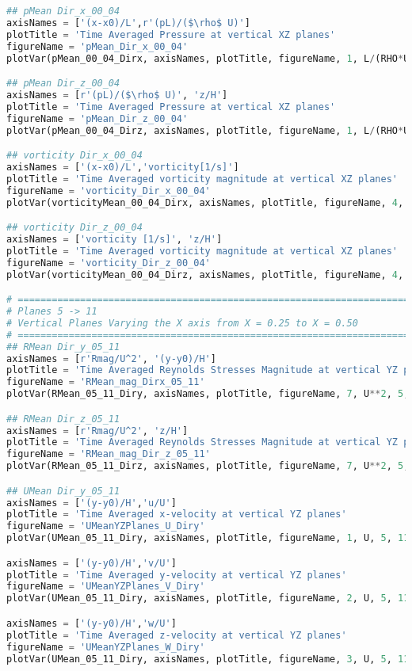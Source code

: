 \begin{lstlisting}[language=python]
## pMean Dir_x_00_04
axisNames = ['(x-x0)/L',r'(pL)/($\rho$ U)']
plotTitle = 'Time Averaged Pressure at vertical XZ planes'
figureName = 'pMean_Dir_x_00_04'
plotVar(pMean_00_04_Dirx, axisNames, plotTitle, figureName, 1, L/(RHO*U), 0, 4)

## pMean Dir_z_00_04
axisNames = [r'(pL)/($\rho$ U)', 'z/H']
plotTitle = 'Time Averaged Pressure at vertical XZ planes'
figureName = 'pMean_Dir_z_00_04'
plotVar(pMean_00_04_Dirz, axisNames, plotTitle, figureName, 1, L/(RHO*U), 0, 4)

## vorticity Dir_x_00_04
axisNames = ['(x-x0)/L','vorticity[1/s]']
plotTitle = 'Time Averaged vorticity magnitude at vertical XZ planes'
figureName = 'vorticity_Dir_x_00_04'
plotVar(vorticityMean_00_04_Dirx, axisNames, plotTitle, figureName, 4, 1, 0, 4)

## vorticity Dir_z_00_04
axisNames = ['vorticity [1/s]', 'z/H']
plotTitle = 'Time Averaged vorticity magnitude at vertical XZ planes'
figureName = 'vorticity_Dir_z_00_04'
plotVar(vorticityMean_00_04_Dirz, axisNames, plotTitle, figureName, 4, 1, 0, 4)

# =============================================================================
# Planes 5 -> 11
# Vertical Planes Varying the X axis from X = 0.25 to X = 0.50
# =============================================================================
## RMean Dir_y_05_11
axisNames = [r'Rmag/U^2', '(y-y0)/H']
plotTitle = 'Time Averaged Reynolds Stresses Magnitude at vertical YZ planes'
figureName = 'RMean_mag_Dirx_05_11'
plotVar(RMean_05_11_Diry, axisNames, plotTitle, figureName, 7, U**2, 5, 11)

## RMean Dir_z_05_11
axisNames = [r'Rmag/U^2', 'z/H']
plotTitle = 'Time Averaged Reynolds Stresses Magnitude at vertical YZ planes'
figureName = 'RMean_mag_Dir_z_05_11'
plotVar(RMean_05_11_Dirz, axisNames, plotTitle, figureName, 7, U**2, 5, 11)

## UMean Dir_y_05_11
axisNames = ['(y-y0)/H','u/U']
plotTitle = 'Time Averaged x-velocity at vertical YZ planes'
figureName = 'UMeanYZPlanes_U_Diry'
plotVar(UMean_05_11_Diry, axisNames, plotTitle, figureName, 1, U, 5, 11)

axisNames = ['(y-y0)/H','v/U']
plotTitle = 'Time Averaged y-velocity at vertical YZ planes'
figureName = 'UMeanYZPlanes_V_Diry'
plotVar(UMean_05_11_Diry, axisNames, plotTitle, figureName, 2, U, 5, 11)

axisNames = ['(y-y0)/H','w/U']
plotTitle = 'Time Averaged z-velocity at vertical YZ planes'
figureName = 'UMeanYZPlanes_W_Diry'
plotVar(UMean_05_11_Diry, axisNames, plotTitle, figureName, 3, U, 5, 11)


\end{lstlisting}
